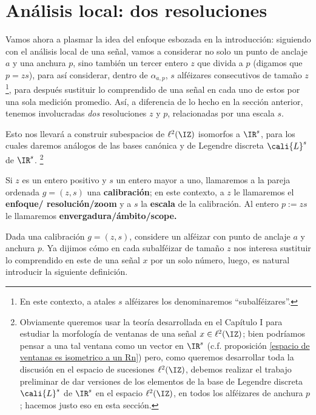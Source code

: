 \section{Análisis local: dos resoluciones}
Vamos ahora a plasmar la idea del enfoque esbozada 
en la introducción:
siguiendo con el análisis local de una señal, vamos
a considerar no solo un punto de anclaje $a$
y una anchura $p$, sino también un tercer entero $z$
que divida a $p$ (digamos que $p=zs$), para así
considerar, dentro de $\alpha_{a,p}$, $s$ alféizares
consecutivos de tamaño $z$\footnote{En este
contexto, a atales $s$ alféizares
los denominaremos ``subalféizares''.}, para después sustituir
lo comprendido de una señal en cada uno de estos
por una sola medición promedio.
Así, a diferencia de lo hecho en la sección anterior,
tenemos involucradas \textit{dos} resoluciones $z$ y $p$,
relacionadas por una escala $s$.

Esto nos llevará a construir subespacios de $\ell^{2}(\IZ)$
isomorfos a $\IR^{s}$, para los cuales daremos análogos
de las bases canónica y de Legendre discreta $\cali{L}^{s}$
de $\IR^{s}$. \footnote{Obviamente queremos
usar la teoría desarrollada en 
el Capítulo I
\TODO{\ref{ParteI header}}
para estudiar la morfología
de ventanas de una señal $x \in  \ell^{2}(\IZ)$; 
bien podríamos pensar a una tal ventana como
un vector en $\IR^{s}$ 
(c.f. proposición \ref{espacio de ventanas es isometrico a un Rn})
pero, como queremos desarrollar toda
la discusión en el espacio
de sucesiones $\ell^{2}(\IZ)$, debemos
realizar el trabajo preliminar de dar versiones de los
elementos de la base 
de Legendre discreta $\cali{L}^{s}$ de $\IR^{s}$ en
el espacio $\ell^{2}(\IZ)$, en todos
los alféizares de anchura $p$; hacemos justo eso en
esta sección.}

\begin{center}
\end{center}

\begin{notacion}
Si $z$ es un entero positivo y $s$ un entero mayor a uno,
llamaremos a la pareja ordenada $g=(z,s)$ una \textbf{calibración};
en este contexto, a $z$ le llamaremos el \textbf{enfoque/
resolución/zoom} y a $s$ la \textbf{escala} de la calibración.
Al entero $p:=zs$ le llamaremos \textbf{envergadura/ámbito/scope.}
\end{notacion}

\noindent Dada
una calibración $g=(z,s)$, 
considere un alféizar con punto de anclaje $a$
y anchura $p$. Ya dijimos
cómo en cada subalféizar de tamaño $z$ nos interesa sustituir
lo comprendido en este de una señal $x$ por un solo número,
luego, es natural introducir la siguiente definición.


